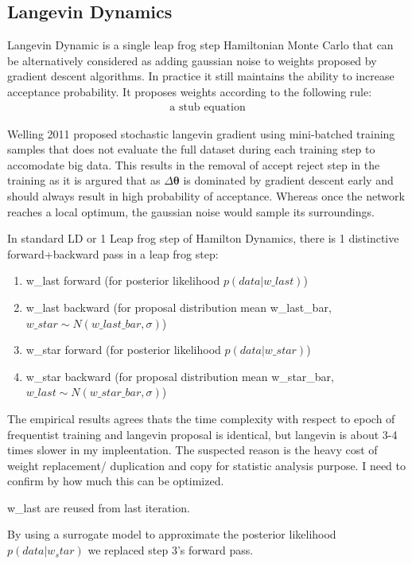 \documentclass[honours,12pt]{unswthesis}
\numberwithin{equation}{section}
\begin{document}
\subsection{Langevin Dynamics}
Langevin Dynamic is a single leap frog step Hamiltonian Monte Carlo that can be alternatively considered as adding gaussian noise to weights proposed by gradient descent algorithms. In practice it still maintains the ability to increase acceptance probability. It proposes weights according to the following rule: 
\begin{gather*}
    \text{a stub equation}
\end{gather*}

Welling 2011 \cite{StochGradLangevin} proposed stochastic langevin gradient using mini-batched training samples that does not evaluate the full dataset during each training step to accomodate big  data. This results in the removal of accept reject step in the training as it is argured that as $\Delta \bm{\theta}$ is dominated by gradient descent early and should always result in high probability of acceptance. Whereas once the network reaches a local optimum, the gaussian noise would sample its surroundings. 


In standard LD or 1 Leap frog step of Hamilton Dynamics, there is 1 distinctive forward+backward pass in a leap frog step:

\begin{enumerate}
    \item w\_last forward (for posterior likelihood $p(data|w\_last)$)
    \item w\_last backward (for proposal distribution mean w\_last\_bar,$w\_star \sim N(w\_last\_bar,\sigma)$) 
    \item w\_star forward (for posterior likelihood $p(data|w\_star)$)
    \item w\_star backward (for proposal distribution mean w\_star\_bar,$w\_last \sim N(w\_star\_bar,\sigma)$) 
\end{enumerate}

The empirical results agrees thats the time complexity with respect to epoch of frequentist training and langevin proposal is identical, but langevin is about 3-4 times slower in my impleentation. The suspected reason is the heavy cost of weight replacement/ duplication and copy for statistic analysis purpose. I need to confirm by how much this can be optimized. 

w\_last are reused from last iteration.

By using a surrogate model to approximate the posterior likelihood $p(data|w_star)$ we replaced step 3's forward pass.
\end{document}
